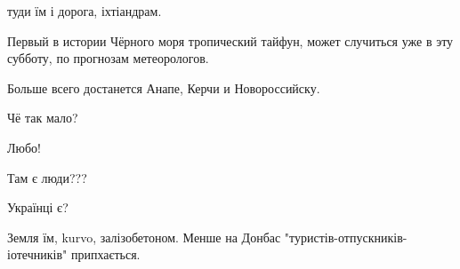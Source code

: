 \begin{itemize}
туди їм і дорога, іхтіандрам.

 

Первый в истории Чёрного моря тропический тайфун, может случиться уже в эту
субботу, по прогнозам метеорологов.

Больше всего достанется Анапе, Керчи и Новороссийску.


 
Чё так мало?

 
Любо!

 
Там є люди???

 
Українці є?

 
Земля їм, kurvo, залізобетоном. Менше на Донбас "туристів-отпускників-іотечників" припхається.

 

\end{itemize}
